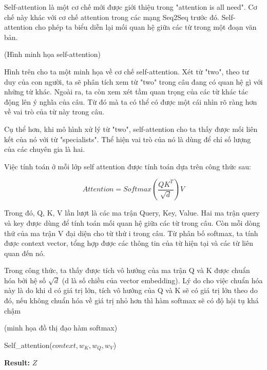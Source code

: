 Self-attention là một cơ chế mới được giới thiệu trong "attention is all need". Cơ chế này khác với cơ chế attention trong các mạng Seq2Seq trước đó. Self-attention cho phép ta biểu diễn lại mối quan hệ giữa các từ trong một đoạn văn bản.

(Hình minh họa self-attention)

Hình trên cho ta một minh họa về cơ chế self-attention. Xét từ "two", theo tư duy của con người, ta sẽ phân tích xem từ "two" trong câu đang có quan hệ gì với những từ khác. Ngoài ra, ta còn xem xét tầm quan trọng của các từ khác tác động lên ý nghĩa của câu. Từ đó mà ta có thể có được một cái nhìn rõ ràng hơn về vai trò của từ này trong câu.

Cụ thể hơn, khi mô hình xử lý từ "two", self-attention cho ta thấy được mối liên kết của nó với từ "specialists". Thể hiện vai trò của nó là dùng để chỉ số lượng của các chuyên gia là hai.

Việc tính toán ở mỗi lớp self attention được tính toán dựa trên công thức sau:

\begin{equation*}
	Attention = Softmax(\frac{QK^T}{\sqrt{d}})V
\end{equation*}

Trong đó, Q, K, V lần lượt là các ma trận Query, Key, Value. Hai ma trận query và key được dùng để tính toán mối quan hệ giữa các từ trong câu. Còn mỗi dòng thứ của ma trận V đại diện cho từ thứ i trong câu. Từ phân bố softmax, ta tính được context vector, tổng hợp được các thông tin của từ hiện tại và các từ liên quan đến nó. 

Trong công thức, ta thấy được tích vô hướng của ma trận Q và K được chuẩn hóa bởi hệ số $\sqrt{d}$ (d là số chiều của vector embedding). Lý do cho việc chuẩn hóa này là do khi d có giá trị lớn, tích vô hướng của Q và K sẽ có giá trị lớn theo do đó, nếu không chuẩn hóa về giá trị nhỏ hơn thì hàm softmax sẽ có độ hội tụ khá chậm

(minh họa đồ thị đạo hàm softmax)

\begin{algorithm}[H]
    \caption{Self\_attention($context, w_K, w_Q, w_V$)}
    \begin{algorithmic}[1]
		\State \textbf{Result:} $Z$
    \end{algorithmic}
\end{algorithm}

